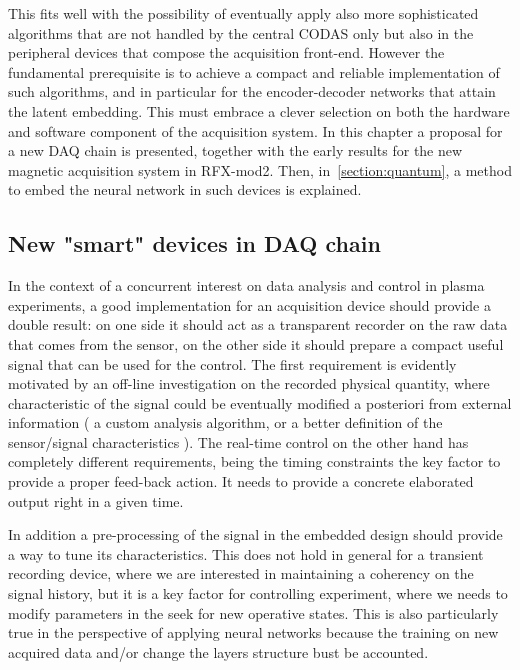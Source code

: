 This fits well with the possibility of eventually apply also more sophisticated algorithms that are not handled by the central CODAS only but also in the peripheral devices that compose the acquisition front-end. 
However the fundamental prerequisite is to achieve a compact and reliable implementation of such algorithms, and in particular for the encoder-decoder networks that attain the latent embedding. This must embrace a clever selection on both the hardware and software component of the acquisition system. In this chapter a proposal for a new DAQ chain is presented, together with the early results for the new magnetic acquisition system in RFX-mod2. Then, in~\cref{section:quantum}, a method to embed the neural network in such devices is explained.


\subsection{New "smart" devices in DAQ chain}
\label{section:daq-chain}

In the context of a concurrent interest on data analysis and control in plasma experiments, a good implementation for an acquisition device should provide a double result: on one side it should act as a transparent recorder on the raw data that comes from the sensor, on the other side it should prepare a compact useful signal that can be used for the control.
The first requirement is evidently motivated by an off-line investigation on the recorded physical quantity, where characteristic of the signal could be eventually modified a posteriori from external information ( a custom analysis algorithm, or a better definition of the sensor/signal characteristics ). 
The real-time control on the other hand has completely different requirements, being the timing constraints the key factor to provide a proper feed-back action. It needs to provide a concrete elaborated output right in a given time.

In addition a pre-processing of the signal in the embedded design should provide a way to tune its characteristics. This does not hold in general for a transient recording device, where we are interested in maintaining a coherency on the signal history, but it is a key factor for controlling experiment, where we needs to modify parameters in the seek for new operative states. This is also particularly true in the perspective of applying neural networks because the training on new acquired data and/or change the layers structure bust be accounted.

